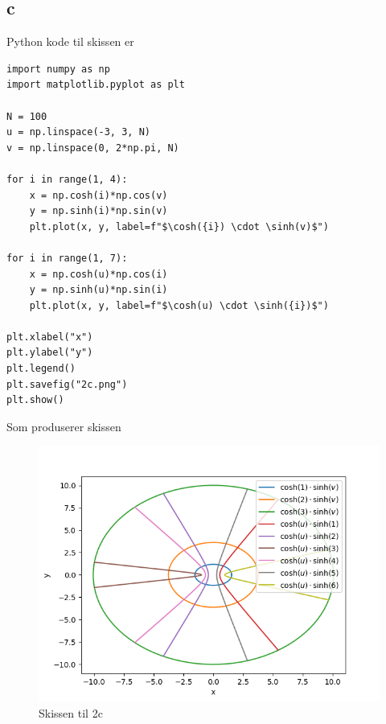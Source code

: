 \documentclass[a4paper,10pt,norsk]{article}
\begin{document}
	\subsection*{c}
	Python kode til skissen er
	\begin{lstlisting}
import numpy as np
import matplotlib.pyplot as plt

N = 100
u = np.linspace(-3, 3, N)
v = np.linspace(0, 2*np.pi, N)

for i in range(1, 4):
    x = np.cosh(i)*np.cos(v)
    y = np.sinh(i)*np.sin(v)
    plt.plot(x, y, label=f"$\cosh({i}) \cdot \sinh(v)$")

for i in range(1, 7):
    x = np.cosh(u)*np.cos(i)
    y = np.sinh(u)*np.sin(i)
    plt.plot(x, y, label=f"$\cosh(u) \cdot \sinh({i})$")

plt.xlabel("x")
plt.ylabel("y")
plt.legend()
plt.savefig("2c.png")
plt.show()
	\end{lstlisting}
	Som produserer skissen
	\begin{figure}[h!]
		\centering
		\caption{Skissen til 2c}
		\label{fig:2c}
		\includegraphics{2c.png}
	\end{figure}
	\newpage	
\end{document}
